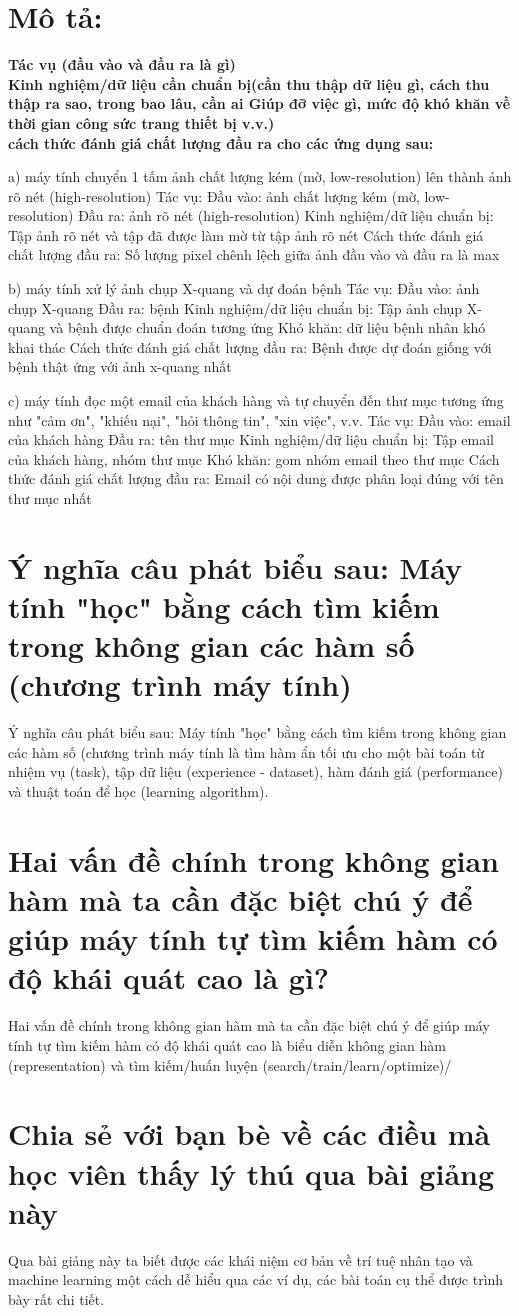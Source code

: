 \documentclass[12pt]{article}
\begin{document}
\section{Mô tả:} 
\textbf{Tác vụ (đầu vào và đầu ra là gì)\\
Kinh nghiệm/dữ liệu cần chuẩn bị(cần thu thập dữ liệu gì, cách thu thập ra sao, trong bao lâu, cần ai Giúp đỡ việc gì, mức độ khó khăn về thời gian công sức trang thiết bị v.v.) \\
cách thức đánh giá chất lượng đầu ra cho các ứng dụng sau:}


a) máy tính chuyển 1 tấm ảnh chất lượng kém (mờ, low-resolution) lên thành ảnh rõ nét (high-resolution)
Tác vụ: 
	Đầu vào: ảnh chất lượng kém (mờ, low-resolution)
	Đầu ra: ảnh rõ nét (high-resolution)
Kinh nghiệm/dữ liệu chuẩn bị: 
	Tập ảnh rõ nét và tập đã được làm mờ từ tập ảnh rõ nét
Cách thức đánh giá chất lượng đầu ra:
	Số lượng pixel chênh lệch giữa ảnh đầu vào và đầu ra là max

b) máy tính xử lý ảnh chụp X-quang và dự đoán bệnh
Tác vụ: 
	Đầu vào: ảnh chụp X-quang
	Đầu ra: bệnh
Kinh nghiệm/dữ liệu chuẩn bị: 
	Tập ảnh chụp X-quang và bệnh được chuẩn đoán tương ứng
	Khó khăn: dữ liệu bệnh nhân khó khai thác
Cách thức đánh giá chất lượng đầu ra:
	Bệnh được dự đoán giống với bệnh thật ứng với ảnh x-quang nhất
	
c) máy tính đọc một email của khách hàng và tự chuyển đến thư mục tương ứng như "cảm ơn", "khiếu nại", "hỏi thông tin", "xin việc", v.v.
Tác vụ: 
	Đầu vào: email của khách hàng
	Đầu ra: tên thư mục
Kinh nghiệm/dữ liệu chuẩn bị: 
	Tập email của khách hàng, nhóm thư mục
	Khó khăn: gom nhóm email theo thư mục
Cách thức đánh giá chất lượng đầu ra:
	Email có nội dung được phân loại đúng với tên thư mục nhất
	
\section{Ý nghĩa câu phát biểu sau: Máy tính "học" bằng cách tìm kiếm trong không gian các hàm số (chương trình máy tính)}
Ý nghĩa câu phát biểu sau: Máy tính "học" bằng cách tìm kiếm trong không gian các hàm số (chương trình máy tính là tìm hàm ẩn tối ưu cho một bài toán từ nhiệm vụ (task), tập dữ liệu (experience - dataset), hàm đánh giá (performance) và thuật toán để học (learning algorithm).

\section{Hai vấn đề chính trong không gian hàm mà ta cần đặc biệt chú ý để giúp máy tính tự tìm kiếm hàm có độ khái quát cao là gì?}
Hai vấn đề chính trong không gian hàm mà ta cần đặc biệt chú ý để giúp máy tính tự tìm kiếm hàm có độ khái quát cao là biểu diễn không gian hàm (representation) và tìm kiếm/huấn luyện (search/train/learn/optimize)/

\section{Chia sẻ với bạn bè về các điều mà học viên thấy lý thú qua bài giảng này}

Qua bài giảng này ta biết được các khái niệm cơ bản về trí tuệ nhân tạo và machine learning một cách dễ hiểu qua các ví dụ, các bài toán cụ thể được trình bày rất chi tiết.

\newpage

\end{document}

